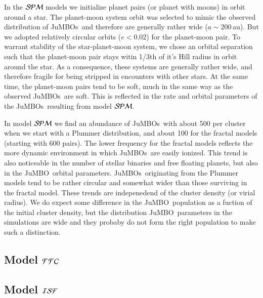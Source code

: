 \documentclass[aa]{lib/aa}
\newcommand{\jumbo}{\mbox{JuMBO}}
\newcommand{\jumbos}{\mbox{JuMBOs}}
\begin{document}
In the ${\cal SPM}$ models we initialize planet pairs (or planet with
moons) in orbit around a star. The planet-moon system orbit was
selected to mimic the observed distribution of \jumbos\, and therefore
are generally rather wide ($a \sim 200$\,au). But we adopted
relatively circular orbits ($e<0.02$) for the planet-moon pair.  To
warrant stability of the star-planet-moon system, we chose an orbital
separation such that the planet-moon pair stays witin 1/3th of it's
Hill radius in orbit around the star. As a consequence, these systems
are generally rather wide, and therefore fragile for being stripped in
encounters with other stars. At the same time, the planet-moon pairs
tend to be soft, much in the same way as the observed \jumbos\, are
soft. This is reflected in the rate and orbital parameters of the
\jumbos\, resulting from model ${\cal SPM}$.

In model ${\cal SPM}$ we find an abundance of \jumbos\, with about 500
per cluster when we start with a Plummer distribution, and about 100
for the fractal models (starting with 600 pairs). The lower frequency
for the fractal models reflects the more dynamic environment in which
\jumbos\, are easily ionized. This trend is also noticeable in the
number of stellar binaries and free floating planets, but also in the
\jumbo\, orbital parameters. \jumbos\, originating from the Plummer
models tend to be rather circular and somewhat wider than those
surviving in the fractal model.  These trends are indepenedend of the
cluster density (or virial radius). We do expect some difference in
the \jumbo\, population as a fuction of the initial cluster density,
but the distribution \jumbo\, parameters in the simulations are wide
and they probaby do not form the right population to make such a
distinction.

\subsection{Model ${\cal FFC}$}


\subsection{Model ${\cal ISF}$}
\end{document}
